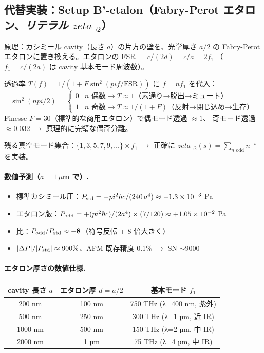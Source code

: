 \documentclass[11pt,a4paper]{article}
\def\pi{pi}%
\def\zeta{zeta}%
\def\textbf#1{#1}%
\begin{document}
\subsection{代替実装：Setup B'-etalon（Fabry-Perot エタロン、\emph{リテラル} $\zeta_{\neg 2}$）}

\begin{theorybox}
\textbf{原理}：カシミール cavity（長さ $a$）の片方の壁を、\textbf{光学厚さ $a/2$
の Fabry-Perot エタロン}に置き換える。エタロンの FSR $= c/(2d) = c/a = 2f_1$
（$f_1 = c/(2a)$ は cavity 基本モード周波数）。

透過率 $T(f) = 1/(1 + F \sin^2(\pi f/\text{FSR}))$ に $f = nf_1$ を代入：
\[
  \sin^2(n\pi/2) = \begin{cases} 0 & n \text{ 偶数}\to T \approx 1\text{（素通り→脱出→ミュート）}\\
                                   1 & n \text{ 奇数}\to T \approx 1/(1+F)\text{（反射→閉じ込め→生存）}\end{cases}
\]
Finesse $F = 30$（標準的な商用エタロン）で偶モード透過 $\approx 1$、
奇モード透過 $\approx 0.032$ $\to$ \textbf{原理的に完璧な偶奇分離}。

残る真空モード集合：$\{1, 3, 5, 7, 9, \ldots\} \times f_1$
$\to$ 正確に $\zeta_{\neg 2}(s) = \sum_{n \text{ odd}} n^{-s}$ を実装。
\end{theorybox}

\paragraph{数値予測（$a = 1\,\mu$m で）.}
\begin{itemize}
\item 標準カシミール圧：$P_{\rm std} = -\pi^2\hbar c/(240\,a^4) \approx -1.3\times 10^{-3}$ Pa
\item エタロン版：$P_{\rm odd} = +(\pi^2\hbar c)/(2 a^4) \times (7/120) \approx +1.05\times 10^{-2}$ Pa
\item \textbf{比}：$P_{\rm odd}/P_{\rm std} \approx \mathbf{-8}$（符号反転 + 8 倍大きく）
\item $|\Delta P|/|P_{\rm std}| \approx 900\%$、AFM 既存精度 0.1\% $\to$ \textbf{SN $\sim 9000$}
\end{itemize}

\paragraph{エタロン厚さの数値仕様.}
\begin{center}
\begin{tabular}{ccc}
\toprule
cavity 長さ $a$ & エタロン厚 $d=a/2$ & 基本モード $f_1$ \\
\midrule
200 nm  & 100 nm & 750 THz (λ=400 nm, 紫外) \\
500 nm  & 250 nm & 300 THz (λ=1 µm, 近 IR) \\
1000 nm & 500 nm & 150 THz (λ=2 µm, 中 IR) \\
2000 nm & 1 µm   & 75 THz  (λ=4 µm, 中 IR) \\
\bottomrule
\end{tabular}
\end{center}
\end{document}

